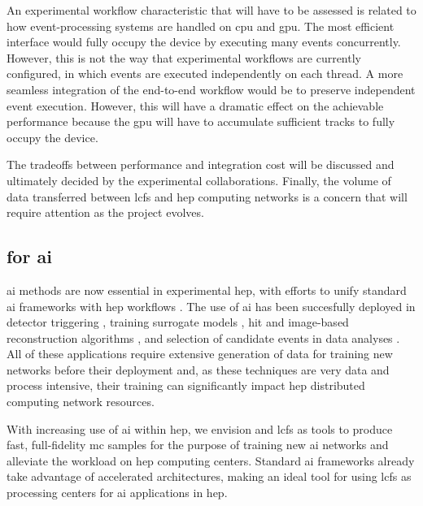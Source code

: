 An experimental workflow characteristic that will have to be assessed is related
to how event-processing systems are handled on \ac{cpu} and \ac{gpu}. The most
efficient interface would fully occupy the device by executing many events
concurrently.  However, this is not the way that experimental workflows are
currently configured, in which events are executed independently on each thread.
A more seamless integration of the end-to-end workflow would be to preserve
independent event execution.  However, this will have a dramatic effect on the
achievable performance because the \ac{gpu} will have to accumulate sufficient
tracks to fully occupy the device.

The tradeoffs between performance and integration cost will be discussed and
ultimately decided by the experimental collaborations. Finally, the volume of
data transferred between \acp{lcf} and \ac{hep} computing networks is a concern
that will require attention as the project evolves.

\subsection{\celeritas for \ac{ai}}
\label{sec:celeritas-ai}

\ac{ai} methods are now essential in experimental \ac{hep}, with efforts to
unify standard \ac{ai} frameworks with \ac{hep} workflows \cite{mlaas4hep}. The
use of \ac{ai} has been succesfully deployed in detector triggering
\cite{ml-trigger}, training surrogate models \cite{fastcalogan}, hit and
image-based reconstruction algorithms \cite{gnn-reco-cms,jets-deep-learning},
and selection of candidate events in data analyses \cite{cvn-nova}. All of these
applications require extensive generation of data for training new networks
before their deployment and, as these techniques are very data and process
intensive, their training can significantly impact \ac{hep} distributed
computing network resources.

With increasing use of \ac{ai} within \ac{hep}, we envision \celeritas and
\acp{lcf} as tools to produce fast, full-fidelity \ac{mc} samples for the
purpose of training new \ac{ai} networks and alleviate the workload on \ac{hep}
computing centers. Standard \ac{ai} frameworks already take advantage of
accelerated architectures, making \celeritas an ideal tool for using \acp{lcf}
as processing centers for \ac{ai} applications in \ac{hep}.

